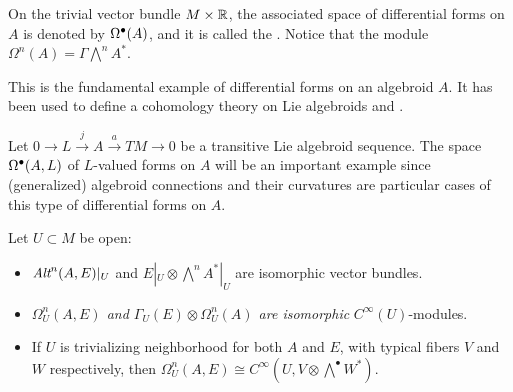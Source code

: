 \lin



\begin{example}
On the trivial vector bundle $M \times \mathbb{R}$, the associated space of differential forms on $A$ is denoted by $\textcolor{black}{\textcolor{black}{\Omega^\bullet(A)}}$, and it is called the . Notice that the module $\Omega^n(A) = \Gamma \bigwedge^n A^*$.

\noindent This is the fundamental example of differential forms on an algebroid $A$. It has been used to define a cohomology theory on Lie algebroids and .
\end{example}

\begin{example}
Let $0 \to L \xrightarrow{j} A \xrightarrow{a} TM \to 0$ be a transitive Lie algebroid sequence.
The space $\textcolor{black}{\Omega^\bullet(A, L)}$ of $L$-valued forms on $A$ will be an important example since (generalized) algebroid connections and their curvatures are particular cases of this type of differential forms on $A$.
\end{example}

\lin

\begin{proposition}\label{propositionIsomorphOmegas}
Let $U\subset M$ be open:
    \begin{itemize}
    
    \item $\operatorname{\textit{Alt}}^n(A, E)|_U$ and $E|_U \otimes \bigwedge^n A^*|_U$ are isomorphic vector bundles.
    
    
    \item \textit{$\Omega_U^n(A, E)$ and $\Gamma_U(E) \otimes \Omega_U^n(A)$ are isomorphic} $C^\infty(U)$-modules.
    
    \item If $U$ is trivializing neighborhood for both $A$ and $E$, with typical fibers $V$ and $W$ respectively, then $\Omega_U^n(A, E) \cong C^\infty(U, V \otimes \bigwedge^\bullet W^*)$.
    
    
    \end{itemize}
\end{proposition}

